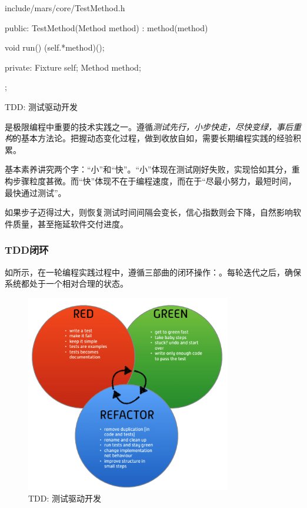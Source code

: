 \begin{content}
\begin{diff}{include/mars/core/TestMethod.h}
\begin{minicpp}
{public:
  TestMethod(Method method)
    : method(method) {
  }

  void run() {
    (self.*method)();
  }

private:
  Fixture self;
  Method method;
};
\end{minicpp}
\end{diff}

\begin{episode}{TDD: 测试驱动开发}
\begin{content}

是极限编程中重要的技术实践之一。遵循\emph{测试先行，小步快走，尽快变绿，事后重构}的基本方法论。把握动态变化过程，做到收放自如，需要长期编程实践的经验积累。

基本素养讲究两个字：“小”和“快”。“小”体现在测试刚好失败，实现恰如其分，重构步骤粒度甚微。而“快”体现不在于编程速度，而在于“尽最小努力，最短时间，最快通过测试”。

如果步子迈得过大，则恢复测试时间间隔会变长，信心指数则会下降，自然影响软件质量，甚至拖延软件交付进度。

\subsubsection{TDD闭环}

如所示，在一轮编程实践过程中，遵循三部曲的闭环操作：。每轮迭代之后，确保系统都处于一个相对合理的状态。

\begin{figure}[H]
\centering
\includegraphics[width=0.8\textwidth]{figures/xunit/tdd-cycle.png}
\caption{TDD: 测试驱动开发}
 \label{fig:tdd-cycle}
\end{figure}


\end{content}
\end{episode}
\end{content}
